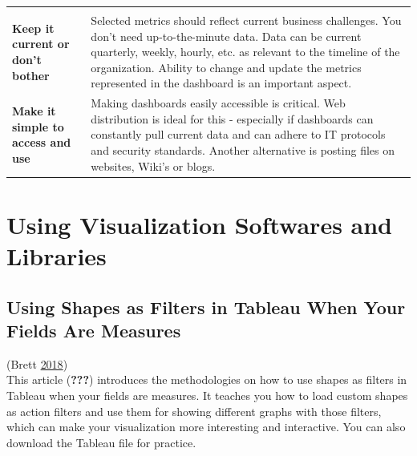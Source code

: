 \documentclass[]{book}
\theoremstyle{definition}
\theoremstyle{definition}
\theoremstyle{definition}
\theoremstyle{remark}
\begin{document}
\begin{longtable}[]{@{}ll@{}}
\begin{minipage}[t]{0.72\columnwidth}
\end{minipage}\tabularnewline
\begin{minipage}[t]{0.17\columnwidth}\raggedright\strut
\textbf{Keep it current or don't bother}\strut
\end{minipage} & \begin{minipage}[t]{0.72\columnwidth}\raggedright\strut
Selected metrics should reflect current business challenges. You don't
need up-to-the-minute data. Data can be current quarterly, weekly,
hourly, etc. as relevant to the timeline of the organization. Ability to
change and update the metrics represented in the dashboard is an
important aspect.\strut
\end{minipage}\tabularnewline
\begin{minipage}[t]{0.17\columnwidth}\raggedright\strut
\textbf{Make it simple to access and use}\strut
\end{minipage} & \begin{minipage}[t]{0.72\columnwidth}\raggedright\strut
Making dashboards easily accessible is critical. Web distribution is
ideal for this - especially if dashboards can constantly pull current
data and can adhere to IT protocols and security standards. Another
alternative is posting files on websites, Wiki's or blogs.\strut
\end{minipage}\tabularnewline
\bottomrule
\end{longtable}

\section{Using Visualization Softwares and
Libraries}\label{using-visualization-softwares-and-libraries}

\subsection{Using Shapes as Filters in Tableau When Your Fields Are
Measures}\label{using-shapes-as-filters-in-tableau-when-your-fields-are-measures}

(Brett \protect\hyperlink{ref-measures}{2018})\\
This article ({\textbf{???}}) introduces the methodologies on how to use
shapes as filters in Tableau when your fields are measures. It teaches
you how to load custom shapes as action filters and use them for showing
different graphs with those filters, which can make your visualization
more interesting and interactive. You can also download the Tableau file
for practice.
\end{document}
